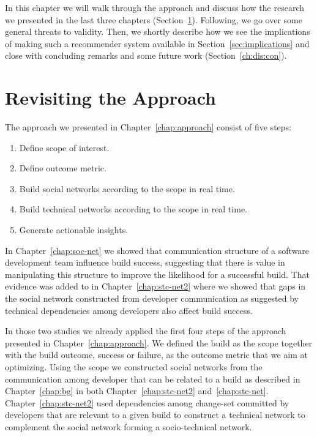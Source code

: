 \label{chap:disc}
In this chapter we will walk through the approach and discuss how the research we presented in the last three chapters (Section~\ref{ch:dis:app}).
Following, we go over some general threats to validity.
Then, we shortly describe how we see the implications of making such a recommender system available in Section~\ref{sec:implications} and close with concluding remarks and some future work (Section~\ref{ch:dis:con}).

\section{Revisiting the Approach}
\label{ch:dis:app}
The approach we presented in Chapter~\ref{chap:approach} consist of five steps:

\begin{enumerate}
\item Define scope of interest.
\item Define outcome metric.
\item Build social networks according to the scope in real time.
\item Build technical networks according to the scope in real time.
\item Generate actionable insights.
\end{enumerate}

In Chapter~\ref{chap:soc-net} we showed that communication structure of a software development team influence build success, suggesting that there is value in manipulating this structure to improve the likelihood for a successful build.
That evidence was added to in Chapter~\ref{chap:stc-net2} where we showed that gaps in the social network constructed from developer communication as suggested by technical dependencies among developers also affect build success.

In those two studies we already applied the first four steps of the approach presented in Chapter~\ref{chap:approach}.
We defined the build as the scope together with the build outcome, success or failure, as the outcome metric that we aim at optimizing.
Using the scope we constructed social networks from the communication among developer that can be related to a build as described in Chapter~\ref{chap:bg} in both Chapter~\ref{chap:stc-net2} and~\ref{chap:stc-net}.
Chapter~\ref{chap:stc-net2} used dependencies among change-set committed by developers that are relevant to a given build to construct a technical network to complement the social network forming a socio-technical network.

